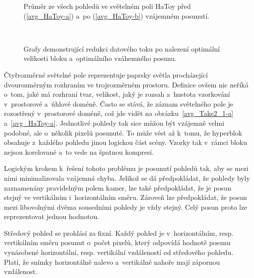 \begin{figure}[htbp]\centering
  \centering
  \vspace*{1em}
  \caption{Průměr ze všech po\-hledů ve světelném poli HaToy před (\ref{avg_HaToy-a}) a~po (\ref{avg_HaToy-b}) vzájemném posunutí.}
  \label{fig:avg_HaToy}
\end{figure}

\begin{figure}[htbp]\centering
  \centering
  \\
  \vspace*{1em}
  \vspace*{1em}
  \caption{Grafy demonstrující redukci datového toku po na\-le\-zení optimální velikosti bloku a~optimálního vzáhemného posunu.}
  \label{fig:shift}
\end{figure}

Čtyřroz\-měrné světelné pole reprezentuje paprsky světla procházející dvouroz\-měrným rozhraním ve troj\-roz\-měrném pro\-s\-toru.
Definice ovšem nic neříká o~tom, jaké má rozhraní tvar, velikost, jaký je rozsah a~hustota vzorkování v~pro\-s\-torové a~úhlové doméně.
Často se stává, že záznam světelného pole je rozostřený v~pro\-s\-torové doméně, což jde vidět na obrázku~\ref{avg_Take2_1-a} a~\ref{avg_HaToy-a}.
Jednotlivé po\-hledy tak sice můžou být vzájemně velmi podobné, ale o~ně\-ko\-lik pixelů posunuté.
To může vést až k~tomu, že hyperblok obsahuje z~každého po\-hledu jinou logickou část scény.
Vzorky tak v~rámci bloku nejsou korelované a~to vede na špatnou kom\-pre\-si.

Logickým krokem k~řešení tohoto problému je posunutí po\-hledů tak, aby se mezi nimi minimalizovala vzájemná chyba.
Jelikož se dá předpokládat, že po\-hledy byly zaznamenány pravidelným polem kamer, lze také předpokládat, že je posun stejný ve vertikálním i~horizontálním směru.
Zároveň lze předpokládat, že posun mezi libovolnými dvěma sousedními po\-hledy je vždy stejný.
Celý posun proto lze reprezentovat jednou hodnotou.

Středový po\-hled se prohlásí za fixní.
Každý po\-hled je v~horizontálním, resp. vertikálním směru posunut o~počet pixelů, který odpovídá hodnotě posunu vynásobené horizontální, resp. vertikální vzdáleností od středového po\-hledu.
Platí, že snímky horizontálně nalevo a~vertikálně nahoře mají zápornou vzdálenost.

